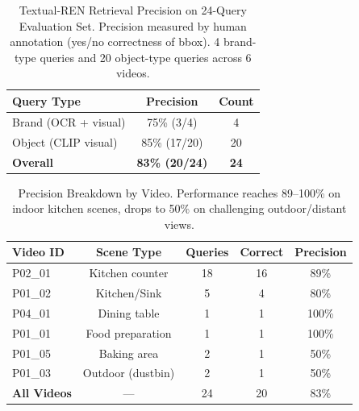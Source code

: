 
\begin{table}[t]
\centering
\caption{Textual-REN Retrieval Precision on 24-Query Evaluation Set.
  Precision measured by human annotation (yes/no correctness of bbox).
  4 brand-type queries and 20 object-type queries across 6 videos.}
\label{tab:quantitative_results}
\begin{tabular}{lcc}
\toprule
\textbf{Query Type} & \textbf{Precision} & \textbf{Count} \\
\midrule
Brand (OCR + visual)        & 75\% (3/4)   & 4 \\
Object (CLIP visual)        & 85\% (17/20) & 20 \\
\midrule
\textbf{Overall}            & \textbf{83\% (20/24)} & \textbf{24} \\
\bottomrule
\end{tabular}
\end{table}

\begin{table}[t]
\centering
\caption{Precision Breakdown by Video. Performance reaches 89--100\%
  on indoor kitchen scenes, drops to 50\% on challenging outdoor/distant views.}
\label{tab:per_video_results}
\begin{tabular}{lcccc}
\toprule
\textbf{Video ID} & \textbf{Scene Type} & \textbf{Queries} & \textbf{Correct} & \textbf{Precision} \\
\midrule
P02\_01 & Kitchen counter    & 18 & 16 & 89\% \\
P01\_02 & Kitchen/Sink       & 5  & 4  & 80\% \\
P04\_01 & Dining table       & 1  & 1  & 100\% \\
P01\_01 & Food preparation   & 1  & 1  & 100\% \\
P01\_05 & Baking area        & 2  & 1  & 50\% \\
P01\_03 & Outdoor (dustbin)  & 2  & 1  & 50\% \\
\midrule
\textbf{All Videos} & — & 24 & 20 & 83\% \\
\bottomrule
\end{tabular}
\end{table}

